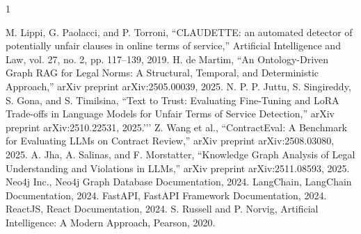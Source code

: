 

%

\begin{thebibliography}{1}

   M. Lippi, G. Paolacci, and P. Torroni, “CLAUDETTE:
  an automated detector of potentially unfair clauses in online terms
  of service,” Artificial Intelligence and Law, vol. 27, no. 2, pp.
  117–139, 2019.
   H. de Martim, “An Ontology-Driven Graph RAG for
  Legal Norms: A Structural, Temporal, and Deterministic Approach,”
  arXiv preprint arXiv:2505.00039, 2025.
   N. P. P. Juttu, S. Singireddy, S. Gona, and S.
  Timilsina, “Text to Trust: Evaluating Fine-Tuning and LoRA
  Trade-offs in Language Models for Unfair Terms of Service
  Detection,” arXiv preprint arXiv:2510.22531, 2025.’’’
   Z. Wang et al., “ContractEval: A Benchmark for
  Evaluating LLMs on Contract Review,” arXiv preprint arXiv:2508.03080, 2025.
   A. Jha, A. Salinas, and F. Morstatter, “Knowledge
  Graph Analysis of Legal Understanding and Violations in LLMs,”
  arXiv preprint arXiv:2511.08593, 2025.
   Neo4j Inc., Neo4j Graph Database Documentation, 2024.
   LangChain, LangChain Documentation, 2024.
   FastAPI, FastAPI Framework Documentation, 2024.
   ReactJS, React Documentation, 2024.
   S. Russell and P. Norvig, Artificial
  Intelligence: A Modern Approach, Pearson, 2020.

\end{thebibliography}
